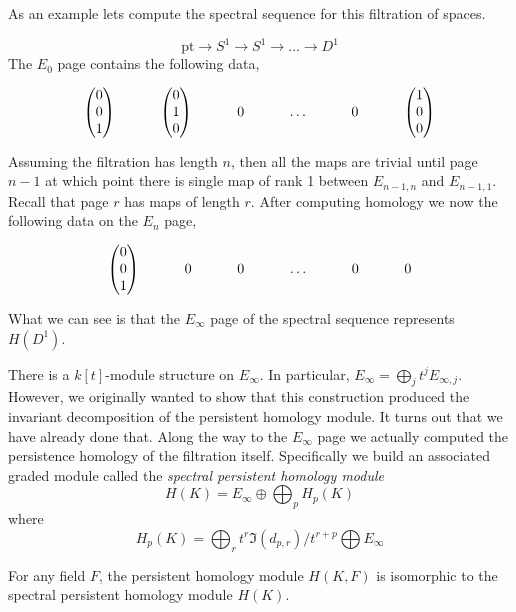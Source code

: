 As an example lets compute the spectral sequence for this filtration of spaces.
\begin{example}
\[ \textrm{pt} \rightarrow S^1 \rightarrow S^1 \rightarrow \ldots \rightarrow D^1 \] 
The $E_0$ page contains the following data,
\[ \begin{tikzcd}
\begin{pmatrix}
0 \\
0 \\
1 \\
\end{pmatrix} & 
\begin{pmatrix}
0 \\ 
1 \\ 
0
\end{pmatrix} & 0 & \ldots & 0 & 
\begin{pmatrix} 
1 \\ 
0 \\ 
0 
\end{pmatrix}
\end{tikzcd} \]
Assuming the filtration has length $n$, then all the maps are trivial until page $n-1$ at which point there is single map of rank 1 between $E_{{n-1},n}$ and $E_{{n-1},1}$.
Recall that page $r$ has maps of length $r$. After computing homology we now the following data on the $E_n$ page,
\[ \begin{tikzcd}
\begin{pmatrix}
0 \\
0 \\
1 \\
\end{pmatrix} & 0 & 0 & \ldots & 0 & 0
\end{tikzcd} \]
What we can see is that the $E_\infty$ page of the spectral sequence represents $H(D^1)$. 
\end{example}
There is a $k[t]$-module structure on $E_\infty$. In particular, $E_\infty = \bigoplus_j t^j E_{\infty,j}$. However, we originally wanted to show that this construction produced the invariant decomposition of the persistent homology module. It turns out that we have already done that. Along the way to the $E_\infty$ page we actually computed the persistence homology of the filtration itself. Specifically we build an associated graded module called the \emph{spectral persistent homology module} \[ H(K) = E_\infty \oplus \bigoplus_p H_p(K) \] where \[ H_p(K) = \bigoplus_r t^r \Im(d_{p,r}) / t^{r+p} \bigoplus E_\infty\]
\begin{theorem}
For any field $F$, the persistent homology module $H(K,F)$ is isomorphic to the spectral persistent homology module $H(K)$.
\end{theorem}
